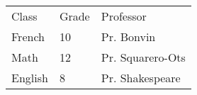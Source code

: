 

\begin{tabu}{ l l l }
		\tableHeaderStyle
		Class & Grade & Professor\\
		French & 10 & Pr. Bonvin\\
		Math & 12 & Pr. Squarero-Ots\\
		English & 8 & Pr. Shakespeare\\
	\end{tabu}